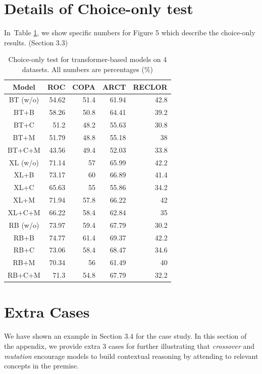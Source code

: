 \documentclass[11pt,a4paper]{article}
\newcommand{\tabref}[1]{Table \ref{#1}}
\begin{document}
\section{Details of Choice-only test}
In~\tabref{tab:only-test}, we show specific numbers for Figure 5 which describe 
the choice-only results. (Section 3.3)
\begin{table}[th]
\centering
\scriptsize
\begin{tabular}{c|rrrr}
\toprule
\textbf{Model} & \textbf{ROC} & \textbf{COPA} & \textbf{ARCT} & \textbf{RECLOR} \\ \midrule
BT (w/o)&54.62&51.4&61.94&42.8 \\ \hline
BT+B&58.26&50.8&64.41&39.2  \\ \hline
BT+C&51.2&48.2&55.63&30.8  \\ \hline
BT+M&51.79&48.8&55.18&38   \\ \hline
BT+C+M&43.56&49.4&52.03&33.8  \\ \midrule
XL (w/o)&71.14&57&65.99&42.2 \\ \hline
XL+B&73.17&60&66.89&41.4  \\ \hline
XL+C&65.63&55&55.86&34.2  \\ \hline
XL+M&71.94&57.8&66.22&42  \\ \hline
XL+C+M&66.22&58.4&62.84&35  \\ \midrule
RB (w/o)&73.97&59.4&67.79&30.2 \\ \hline
RB+B&74.77&61.4&69.37&42.2  \\ \hline
RB+C&73.06&58.4&68.47&34.6  \\ \hline
RB+M&70.34&56&61.49&40      \\ \hline
RB+C+M&71.3&54.8&67.79&32.2  \\ 
\bottomrule
\end{tabular}
\caption{Choice-only test for transformer-based models on 4 datasets. All numbers are percentages (\%)}
\label{tab:only-test}
\end{table}

\section{Extra Cases}
We have shown an example in Section 3.4 for the case study. In this section of the appendix, we 
provide extra 3 cases for further illustrating that \textit{crossover} and \textit{mutation} 
encourage models to build contextual reasoning  
by attending to relevant concepts in the premise. 
\end{document}
